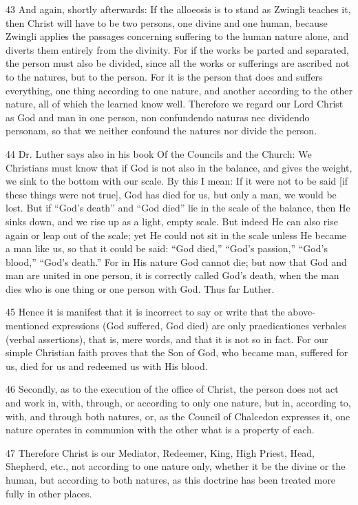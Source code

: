 {43 And again, shortly afterwards: If the alloeosis is to stand as Zwingli teaches it, then Christ will have to be two persons, one divine and one human, because Zwingli applies the passages concerning suffering to the human nature alone, and diverts them entirely from the divinity. For if the works be parted and separated, the person must also be divided, since all the works or sufferings are ascribed not to the natures, but to the person. For it is the person that does and suffers everything, one thing according to one nature, and another according to the other nature, all of which the learned know well. Therefore we regard our Lord Christ as God and man in one person, non confundendo naturas nec dividendo personam, so that we neither confound the natures nor divide the person.

44 Dr. Luther says also in his book Of the Councils and the Church: We Christians must know that if God is not also in the balance, and gives the weight, we sink to the bottom with our scale. By this I mean: If it were not to be said [if these things were not true], God has died for us, but only a man, we would be lost. But if “God’s death” and “God died” lie in the scale of the balance, then He sinks down, and we rise up as a light, empty scale. But indeed He can also rise again or leap out of the scale; yet He could not sit in the scale unless He became a man like us, so that it could be said: “God died,” “God’s passion,” “God’s blood,” “God’s death.” For in His nature God cannot die; but now that God and man are united in one person, it is correctly called God’s death, when the man dies who is one thing or one person with God. Thus far Luther.

45 Hence it is manifest that it is incorrect to say or write that the above-mentioned expressions (God suffered, God died) are only praedicationes verbales (verbal assertions), that is, mere words, and that it is not so in fact. For our simple Christian faith proves that the Son of God, who became man, suffered for us, died for us and redeemed us with His blood.

46 Secondly, as to the execution of the office of Christ, the person does not act and work in, with, through, or according to only one nature, but in, according to, with, and through both natures, or, as the Council of Chalcedon expresses it, one nature operates in communion with the other what is a property of each.

47 Therefore Christ is our Mediator, Redeemer, King, High Priest, Head, Shepherd, etc., not according to one nature only, whether it be the divine or the human, but according to both natures, as this doctrine has been treated more fully in other places.

}
